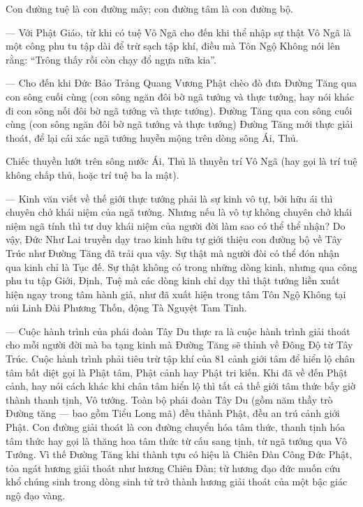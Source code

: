 Con đường tuệ là con đường mây; con đường tâm là con đường bộ.

— Với Phật Giáo, từ khi có tuệ Vô Ngã cho đến khi thể nhập sự thật Vô Ngã là một công phu tu tập dài để trừ sạch tập khí, điều mà Tôn Ngộ Không nói lên rằng: ``Trông thấy rồi còn chạy đổ ngựa nữa kia''.

— Cho đến khi Đức Bảo Trảng Quang Vương Phật chèo đò đưa Đường Tăng qua con sông cuối cùng (con sông ngăn đôi bờ ngã tướng và thực tướng, hay nói khác đi con sông nối đôi bờ ngã tướng và thực tướng). Đường Tăng qua con sông cuối cùng (con sông ngăn đôi bờ ngã tướng và thực tướng) Đường Tăng mới thực giải thoát, để lại cái xác ngã tướng huyễn mộng trên dòng sông Ái, Thủ.

Chiếc thuyền lướt trên sông nước Ái, Thủ là thuyền trí Vô Ngã (hay gọi là trí tuệ không chấp thủ, hoặc trí tuệ ba la mật).

— Kinh văn viết về thế giới thực tướng phải là sự kinh vô tự, bởi hữu ái thì chuyên chở khái niệm của ngã tướng. Nhưng nếu là vô tự không chuyên chở khái niệm ngã tính thì tư duy khái niệm của người đời làm sao có thể thể nhận? Do vậy, Đức Như Lai truyền dạy trao kinh hữu tự giới thiệu con đường bộ về Tây Trúc như Đường Tăng đã trải qua vậy. Sự thật mà người đòi có thể đón nhận qua kinh chỉ là Tục đế. Sự thật không có trong những dòng kinh, nhưng qua công phu tu tập Giới, Định, Tuệ mà các dòng kinh chỉ dạy thì thật tướng liền xuất hiện ngay trong tâm hành giả, như đã xuất hiện trong tâm Tôn Ngộ Không tại núi Linh Đài Phương Thốn, động Tà Nguyệt Tam Tinh.

— Cuộc hành trình của phái đoàn Tây Du thực ra là cuộc hành trình giải thoát cho mỗi người đời mà ba tạng kinh mà Đường Tăng sẽ thỉnh về Đông Độ từ Tây Trúc. Cuộc hành trình phải tiêu trừ tập khí của 81 cảnh giới tâm để hiển lộ chân tâm bất diệt gọi là Phật tâm, Phật cảnh hay Phật tri kiến. Khi đã về đến Phật cảnh, hay nói cách khác khi chân tâm hiển lộ thì tất cả thế giới tâm thức bấy giờ thành thanh tịnh, Vô tướng. Toàn bộ phái đoàn Tây Du (gồm năm thầy trò Đường tăng — bao gồm Tiểu Long mã) đều thành Phật, đều an trú cảnh giới Phật. Con đường giải thoát là con đường chuyển hóa tâm thức, thanh tịnh hóa tâm thức hay gọi là thăng hoa tâm thức từ cấu sang tịnh, từ ngã tướng qua Vô Tướng. Vì thế Đường Tăng khi thành tựu có hiệu là Chiên Đàn Công Đức Phật, tỏa ngát hương giải thoát như hương Chiên Đàn; từ hương đạo đức muốn cứu khổ chúng sinh trong dòng sinh tử trở thành hương giải thoát của một bậc giác ngộ đạo vàng.

